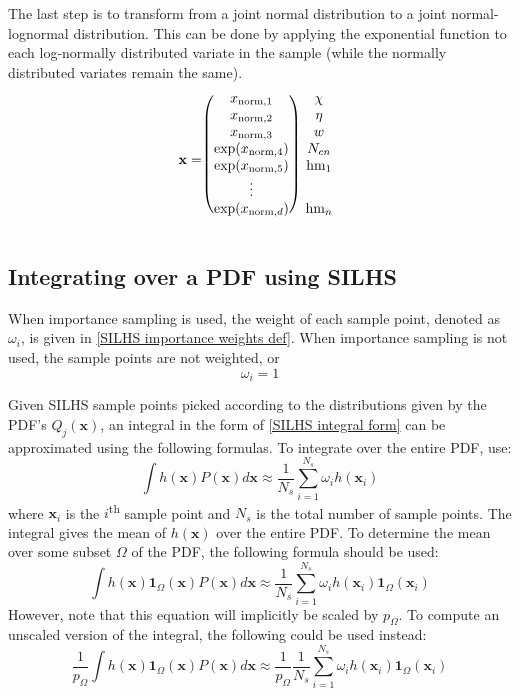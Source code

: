 \documentclass[11pt,fleqn]{article}
\begin{document}
The last step is to transform from a joint normal distribution to a joint
normal-lognormal distribution. This can be done by applying the exponential
function to each log-normally distributed variate in the sample (while the
normally distributed variates remain the same).
\begin{equation}
\mathbf{x} =
\begin{blockarray}{cc}
\begin{block}{(c)c}
x_{\mathrm{norm},1} & \chi \\
x_{\mathrm{norm},2} & \eta \\
x_{\mathrm{norm},3} & w \\
\exp(x_{\mathrm{norm},4}) & N_{cn} \\
\exp(x_{\mathrm{norm},5}) & \mathrm{hm}_1 \\
\vdots & \\
\exp(x_{\mathrm{norm},d}) & \mathrm{hm}_n \\
\end{block}
\end{blockarray}
\end{equation}

\subsection{Integrating over a PDF using SILHS}

When importance sampling is used, the weight of each sample point, denoted as
$\omega_i$, is given in \eqref{SILHS importance weights def}. When importance
sampling is not used, the sample points are not weighted, or
\begin{equation}
\omega_i = 1
\end{equation}

Given SILHS sample points picked according to the distributions given by the PDF's
$Q_j(\mathbf{x})$, an integral in the form of \eqref{SILHS integral form} can be
approximated using the following formulas. To integrate over the entire PDF,
use:
\begin{equation}
\int h(\mathbf{x}) P(\mathbf{x}) d\mathbf{x} \approx \frac{1}{N_s}
\sum_{i=1}^{N_s} \omega_i h(\mathbf{x}_i)
\end{equation}
where $\mathbf{x}_i$ is the $i$\textsuperscript{th} sample point and $N_s$ is
the total number of sample points. The integral gives the mean of
$h(\mathbf{x})$ over the entire PDF. To determine the mean over some subset
$\Omega$ of the PDF, the following formula should be used:
\begin{equation}
\int h(\mathbf{x})\mathbf{1}_\Omega(\mathbf{x}) P(\mathbf{x}) d\mathbf{x}
\approx \frac{1}{N_s}\sum_{i=1}^{N_s} \omega_i
h(\mathbf{x}_i) \mathbf{1}_\Omega(\mathbf{x}_i)
\end{equation}
However, note that this equation will implicitly be scaled by $p_\Omega$. To
compute an unscaled version of the integral, the following could be used
instead:
\begin{equation}
\frac{1}{p_\Omega}
\int h(\mathbf{x})\mathbf{1}_\Omega(\mathbf{x}) P(\mathbf{x}) d\mathbf{x}
\approx \frac{1}{p_\Omega}\frac{1}{N_s}\sum_{i=1}^{N_s} \omega_i
h(\mathbf{x}_i) \mathbf{1}_\Omega(\mathbf{x}_i)
\end{equation}
\end{document}
